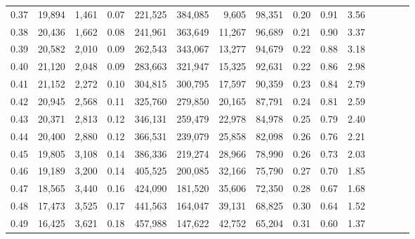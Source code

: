 \begin{tabular}{rrrcrrrrrrrrrrr}
0.37 &  19,894 &  1,461 &                                       0.07 &  221,525 &  384,085 &    9,605 &   98,351 &  0.20 &  0.91 &                         3.56 \\
0.38 &  20,436 &  1,662 &                                       0.08 &  241,961 &  363,649 &   11,267 &   96,689 &  0.21 &  0.90 &                         3.37 \\
0.39 &  20,582 &  2,010 &                                       0.09 &  262,543 &  343,067 &   13,277 &   94,679 &  0.22 &  0.88 &                         3.18 \\
0.40 &  21,120 &  2,048 &                                       0.09 &  283,663 &  321,947 &   15,325 &   92,631 &  0.22 &  0.86 &                         2.98 \\
0.41 &  21,152 &  2,272 &                                       0.10 &  304,815 &  300,795 &   17,597 &   90,359 &  0.23 &  0.84 &                         2.79 \\
0.42 &  20,945 &  2,568 &                                       0.11 &  325,760 &  279,850 &   20,165 &   87,791 &  0.24 &  0.81 &                         2.59 \\
0.43 &  20,371 &  2,813 &                                       0.12 &  346,131 &  259,479 &   22,978 &   84,978 &  0.25 &  0.79 &                         2.40 \\
0.44 &  20,400 &  2,880 &                                       0.12 &  366,531 &  239,079 &   25,858 &   82,098 &  0.26 &  0.76 &                         2.21 \\
0.45 &  19,805 &  3,108 &                                       0.14 &  386,336 &  219,274 &   28,966 &   78,990 &  0.26 &  0.73 &                         2.03 \\
0.46 &  19,189 &  3,200 &                                       0.14 &  405,525 &  200,085 &   32,166 &   75,790 &  0.27 &  0.70 &                         1.85 \\
0.47 &  18,565 &  3,440 &                                       0.16 &  424,090 &  181,520 &   35,606 &   72,350 &  0.28 &  0.67 &                         1.68 \\
0.48 &  17,473 &  3,525 &                                       0.17 &  441,563 &  164,047 &   39,131 &   68,825 &  0.30 &  0.64 &                         1.52 \\
0.49 &  16,425 &  3,621 &                                       0.18 &  457,988 &  147,622 &   42,752 &   65,204 &  0.31 &  0.60 &                         1.37 \\

\end{tabular}

